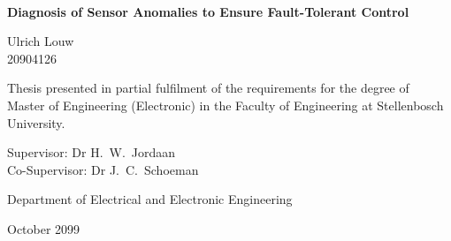 \graphicspath{{frontmatter/fig/}}

\begin{titlepage}
	\begin{center}
		
		
		
		~\vspace{4.5em}
		
		{\sffamily \bfseries \huge Diagnosis of Sensor Anomalies to Ensure Fault-Tolerant Control \par}
		
		\vspace{7em}
		
		{\large {\Large  Ulrich Louw} \\ 20904126 \par}
		
		\vspace{8em}
		
		{\large Thesis presented in partial fulfilment of the requirements for the degree of \\ Master of Engineering (Electronic) in the Faculty of Engineering at Stellenbosch University. \par}
		
		\vfill
		
		{\large {Supervisor}: Dr H.\ W.\ Jordaan} \\

		{\large {Co-Supervisor}: Dr J.\ C.\ Schoeman}\\
		{Department of Electrical and Electronic Engineering \par}		
		\vspace{10em}
		
		{\Large October 2099}
	\end{center}
\end{titlepage}
